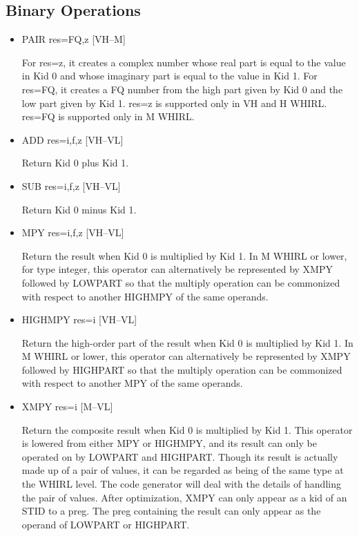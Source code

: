 \documentclass{article}
\begin{document}
\subsection{Binary Operations}
\begin{itemize}

\item  PAIR res=FQ,z \hfill [VH--M]

For res=z, it creates a complex number whose real part is equal to
the value in Kid 0 and whose imaginary part is equal to the value
in Kid 1. For res=FQ, it creates a FQ number from the high part given by Kid
0 and the low part given by Kid 1. res=z is supported only in VH
and H WHIRL. res=FQ is supported only in M WHIRL. 

\item  ADD res=i,f,z \hfill [VH--VL]

Return Kid 0 plus Kid 1.


\item  SUB res=i,f,z \hfill [VH--VL]

Return Kid 0 minus Kid 1.

\item  MPY res=i,f,z \hfill [VH--VL]

Return the result when Kid 0 is multiplied by Kid 1. In M WHIRL
or lower, for type integer, this operator can alternatively be
represented by
XMPY followed by LOWPART so that the multiply operation can be
commonized with respect to another
HIGHMPY of the same operands.

\item  HIGHMPY res=i \hfill [VH--VL]

Return the high-order part of the result when Kid 0 is multiplied
by Kid 1. In M WHIRL or lower, this operator can alternatively be
represented
by XMPY followed by HIGHPART so that the multiply operation can
be commonized with respect to another
MPY of the same operands.

\item  XMPY res=i \hfill [M--VL]

Return the composite result when Kid 0 is multiplied by Kid 1. This
operator is lowered from either
MPY or HIGHMPY, and its result can only be operated on by LOWPART
and HIGHPART. Though its result is actually made up of a pair of
values, it can be regarded as being of the same type
at the WHIRL level. The code generator will deal with the details
of handling the pair of values. After optimization,
XMPY can only appear as a kid of an STID to a preg. The preg containing
the result can only appear as the operand of
LOWPART or HIGHPART.


\end{itemize}
\end{document}
